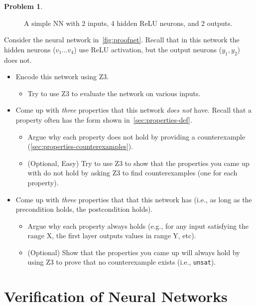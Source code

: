 \documentclass[oneside,11pt,dvipsnames]{book}
\numberwithin{equation}{section}
\theoremstyle{definition}
\newtheorem{problem}{Problem}[section]
\theoremstyle{remark}
\newcommand{\unsat}{\texttt{unsat}}
\begin{document}
\begin{problem}\label{problem:z3-properties}

\begin{figure}
\centering
{}
\caption{\label{fig:proofnet}A simple NN with 2 inputs, 4 hidden ReLU neurons, and 2 outputs.}
\end{figure}



Consider the neural network in~\autoref{fig:proofnet}. Recall that in this network the hidden neurons ($v_1 \ldots v_4$) use ReLU activation, but the output neurons ($y_1,y_2$) does not.


\begin{itemize}
    \item Encode this network using Z3.
    \begin{itemize}
        \item Try to use Z3 to evaluate the network on various inputs.
    \end{itemize}
\item Come up with \emph{three} properties that this network \emph{does not} have.  Recall that a property often has the form shown in~\autoref{sec:properties-def}.
\begin{itemize}
    \item Argue why each property does not hold by providing a counterexample (\autoref{sec:properties-counterexamples}).
    \item (Optional, Easy) Try to use Z3 to show that the properties you came up with do not hold by asking Z3 to find counterexamples (one for each property).
\end{itemize}
\item Come up with \emph{three} properties that that this network has (i.e., as long as the precondition holds, the postcondition holds).
\begin{itemize}
    \item Argue why each property always holds (e.g., for any input satisfying the range X, the first layer outputs values in range Y, etc).
    \item (Optional) Show that the properties you came up will always hold by using Z3 to prove that no counterexample exists (i.e., \unsat{}).
\end{itemize}
\end{itemize}

\end{problem}

\chapter{Verification of Neural Networks}\label{sec:verification}
\end{document}
